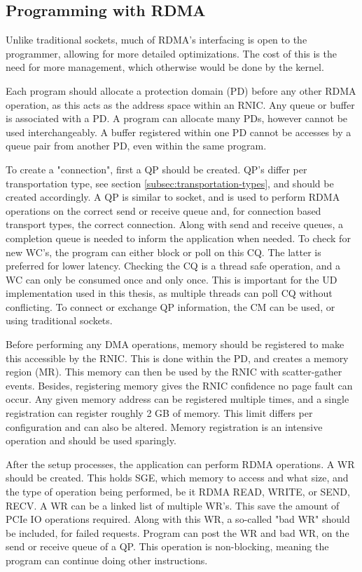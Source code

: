 \subsection{Programming with RDMA}\label{subsec:programming-with-rdma}
Unlike traditional sockets, much of RDMA's interfacing is open to the programmer, allowing for more detailed optimizations.
The cost of this is the need for more management, which otherwise would be done by the kernel.

Each program should allocate a protection domain (PD) before any other RDMA operation, as this acts as the address space within an RNIC.
Any queue or buffer is associated with a PD.
A program can allocate many PDs, however cannot be used interchangeably.
A buffer registered within one PD cannot be accesses by a queue pair from another PD, even within the same program.

To create a "connection", first a QP should be created.
QP's differ per transportation type, see section \ref{subsec:transportation-types}, and should be created accordingly.
A QP is similar to socket, and is used to perform RDMA operations on the correct send or receive queue and, for connection based transport types, the correct connection.
Along with send and receive queues, a completion queue is needed to inform the application when needed.
To check for new WC's, the program can either block or poll on this CQ.
The latter is preferred for lower latency.
Checking the CQ is a thread safe operation, and a WC can only be consumed once and only once.
This is important for the UD implementation used in this thesis, as multiple threads can poll CQ without conflicting.
To connect or exchange QP information, the CM can be used, or using traditional sockets.

Before performing any DMA operations, memory should be registered to make this accessible by the RNIC.
This is done within the PD, and creates a memory region (MR).
This memory can then be used by the RNIC with scatter-gather events.
Besides, registering memory gives the RNIC confidence no page fault can occur.
Any given memory address can be registered multiple times, and a single registration can register roughly 2 GB of memory.
This limit differs per configuration and can also be altered.
Memory registration is an intensive operation and should be used sparingly.

After the setup processes, the application can perform RDMA operations.
A WR should be created.
This holds SGE, which memory to access and what size, and the type of operation being performed, be it RDMA READ, WRITE, or SEND, RECV.
A WR can be a linked list of multiple WR's.
This save the amount of PCIe IO operations required.
Along with this WR, a so-called "bad WR" should be included, for failed requests.
Program can post the WR and bad WR, on the send or receive queue of a QP.
This operation is non-blocking, meaning the program can continue doing other instructions.

